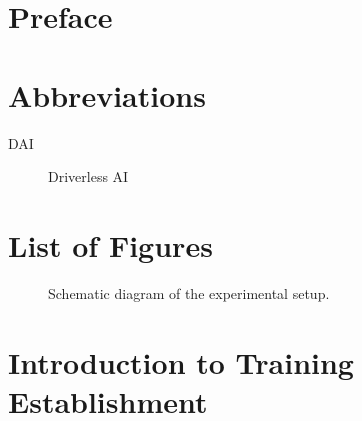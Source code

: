 \documentclass[12pt,a4paper]{report}
\begin{document}
\renewcommand\bibname{References} 



\chapter*{Preface}


\tableofcontents


\newpage
{} 

\chapter*{Abbreviations}

\begin{description}
\item[DAI] Driverless AI

\end{description}

\chapter*{List of Figures}

\begin{figure}[htbp]

\caption{Schematic diagram of the experimental setup.}

\end{figure}



\chapter{Introduction to Training Establishment}
\end{document}
